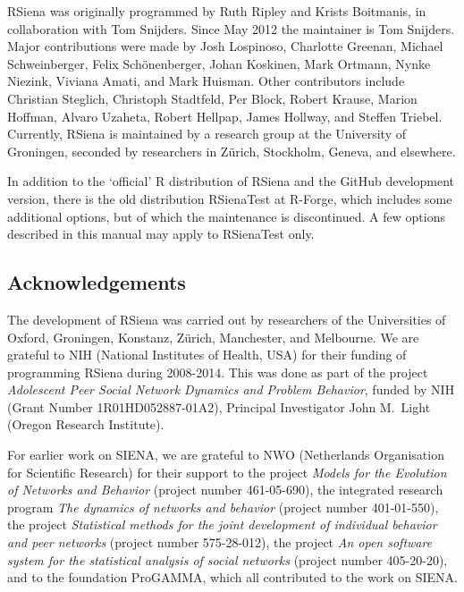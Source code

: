 \documentclass[a4paper,fleqn,11pt]{article}
\newcommand{\+}{\, + \,}
\newcommand{\sfn}[1]{\textsf{#1}}
\newcommand{\R}{{\sf R }}
\newcommand{\RS}{{\sf \textsf{RSiena} }}
\newcommand{\si}{{\sf SIENA}}
\begin{document}
\RS was originally programmed by Ruth Ripley and Krists Boitmanis,
in collaboration with Tom Snijders.
Since May 2012 the maintainer is Tom Snijders.
Major contributions were made by Josh Lospinoso, Charlotte Greenan,
Michael Schweinberger,
Felix Sch\"{o}nenberger, Johan Koskinen, Mark Ortmann, Nynke Niezink,
Viviana Amati, and Mark Huisman.
Other contributors include
Christian Steglich, Christoph Stadtfeld, Per Block,
Robert Krause, Marion Hoffman, Alvaro Uzaheta,
Robert Hellpap, James Hollway, and Steffen Triebel.
Currently, \RS is maintained by a research group
at the University of Groningen, seconded by researchers in Z\"{u}rich,
Stockholm, Geneva, and elsewhere.

In addition to the `official' \R distribution of \RS
and the \sfn{GitHub} development version, there is
the old distribution \sfn{RSienaTest} at \sfn{R-Forge},
which includes some additional options,
but of which the maintenance is discontinued.
A few options described in this manual may apply to
{\sf RSienaTest} only.

\subsection{Acknowledgements}

The development of \RS was carried out by researchers of the Universities
of Oxford, Groningen, Konstanz, Z\"{u}rich, Manchester, and Melbourne.
We are grateful to NIH (National Institutes of Health, USA)
for their funding of programming \RS during 2008-2014.
This was done
as part of the project \emph{Adolescent Peer Social Network Dynamics
and Problem Behavior}, funded by NIH (Grant Number 1R01HD052887-01A2),
Principal Investigator John M.\ Light (Oregon Research Institute).

For earlier work on \si, we are grateful to NWO (Netherlands Organisation for
Scientific Research) for their support to the project
\emph{Models for the Evolution of Networks and Behavior}
(project number 461-05-690),
the integrated research program
\emph{The dynamics of networks and behavior} (project number 401-01-550),
the project \emph{Statistical methods for the joint development of
individual behavior and peer networks} (project number 575-28-012),
the project \emph{An open software system for the statistical
analysis of social networks} (project number 405-20-20),
and to the foundation ProGAMMA,
which all contributed to the work on \si.

\newpage
\end{document}
